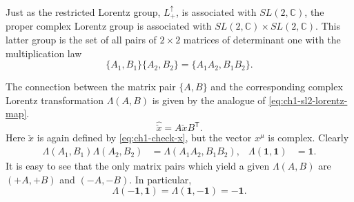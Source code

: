 

Just as the restricted Lorentz group, $L^\uparrow_+$, is associated with
$SL(2,\mathbb C)$, the proper complex Lorentz group is associated with
$SL(2,\mathbb C)\times SL(2,\mathbb C)$. This latter group is the set of all
pairs of $2\times2$ matrices of determinant one with the multiplication law
\[
  \{A_1,B_1\}\{A_2,B_2\}=\{A_1A_2,B_1B_2\}.
\]

The connection between the matrix pair $\{A,B\}$ and the corresponding complex
Lorentz transformation $\Lambda(A,B)$ is given by the analogue of \eqref{eq:ch1-sl2-lorentz-map}.
\begin{equation}
  \widehat{\check{x}}=A\check{x}B^{\mathsf T}.
  \tag{1-19}\label{eq:ch1-complex-sl2-map}
\end{equation}
Here $\check{x}$ is again defined by \eqref{eq:ch1-check-x}, but the vector $x^\mu$ is
complex. Clearly
\begin{equation}
\begin{aligned}
  \Lambda(A_1,B_1)\Lambda(A_2,B_2)
  &=\Lambda(A_1A_2,B_1B_2),
  & \Lambda(\mathbf{1},\mathbf{1})&=\mathbf{1}.
\end{aligned}
  \tag{1-20}\label{eq:ch1-complex-sl2-homomorphism}
\end{equation}
It is easy to see that the only matrix pairs which yield a given
$\Lambda(A,B)$ are $(+A,+B)$ and $(-A,-B)$. In particular,
\begin{equation}
  \Lambda(-\mathbf{1},\mathbf{1})
  =\Lambda(\mathbf{1},-\mathbf{1})=-\mathbf{1}.
  \tag{1-21}\label{eq:ch1-complex-sl2-kernel}
\end{equation}

